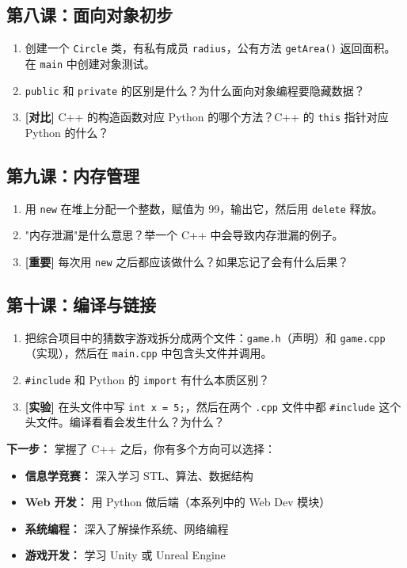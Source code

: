 \documentclass[a4paper,12pt]{ctexart}
\begin{document}
\subsection*{第八课：面向对象初步}
\begin{enumerate}
  \item 创建一个 \texttt{Circle} 类，有私有成员 \texttt{radius}，公有方法 \texttt{getArea()} 返回面积。在 \texttt{main} 中创建对象测试。
  \item \texttt{public} 和 \texttt{private} 的区别是什么？为什么面向对象编程要隐藏数据？
  \item \textbf{[对比]} C++ 的构造函数对应 Python 的哪个方法？C++ 的 \texttt{this} 指针对应 Python 的什么？
\end{enumerate}

\subsection*{第九课：内存管理}
\begin{enumerate}
  \item 用 \texttt{new} 在堆上分配一个整数，赋值为 99，输出它，然后用 \texttt{delete} 释放。
  \item "内存泄漏"是什么意思？举一个 C++ 中会导致内存泄漏的例子。
  \item \textbf{[重要]} 每次用 \texttt{new} 之后都应该做什么？如果忘记了会有什么后果？
\end{enumerate}

\subsection*{第十课：编译与链接}
\begin{enumerate}
  \item 把综合项目中的猜数字游戏拆分成两个文件：\texttt{game.h}（声明）和 \texttt{game.cpp}（实现），然后在 \texttt{main.cpp} 中包含头文件并调用。
  \item \texttt{\#include} 和 Python 的 \texttt{import} 有什么本质区别？
  \item \textbf{[实验]} 在头文件中写 \texttt{int x = 5;}，然后在两个 \texttt{.cpp} 文件中都 \texttt{\#include} 这个头文件。编译看看会发生什么？为什么？
\end{enumerate}

\textbf{下一步：} 掌握了 C++ 之后，你有多个方向可以选择：
\begin{itemize}
  \item \textbf{信息学竞赛：} 深入学习 STL、算法、数据结构
  \item \textbf{Web 开发：} 用 Python 做后端（本系列中的 Web Dev 模块）
  \item \textbf{系统编程：} 深入了解操作系统、网络编程
  \item \textbf{游戏开发：} 学习 Unity 或 Unreal Engine
\end{itemize}
\end{document}
